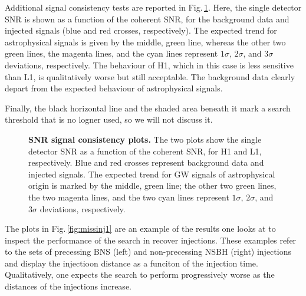 \documentclass[binding=0.6cm, LaM]{sapthesis}
\begin{document}
	Additional signal consistency tests are reported in Fig.\,\ref{fig:detector1}. 
	Here, the single detector SNR is shown as a function of the coherent SNR, 
	for the background data and injected signals (blue and red crosses, respectively).
	The expected trend for astrophysical signals is given by the middle, green line, 
	whereas the other two green lines, the magenta lines, and the cyan lines represent $1\sigma$, $2\sigma$, 
	and $3\sigma$ deviations, respectively.
	The behaviour of H1, which in this case is less sensitive than L1, 
	is qualitatively worse but still acceptable.  
	The background data clearly depart from the expected behaviour of astrophysical signals.
        
	Finally, the black horizontal line and the shaded area beneath it mark a search threshold 
	that is no logner used, so we will not discuss it.
        \begin{figure}[!t]
          \noindent
          \label{detector1}
          \centering
          \caption{\textbf{SNR signal consistency plots.} The two plots show the single detector SNR as a function of the coherent SNR, for H1 and L1, respectively.  Blue and red crosses represent background data and injected signals.  The expected trend for GW signals of astrophysical origin is marked by the middle, green line; the other two green lines, the two magenta lines, and the two cyan lines represent $1\sigma$, $2\sigma$, and $3\sigma$ deviations, respectively.}
          \label{fig:detector1}
        \end{figure}
	The plots in Fig.\,\ref{fig:missinj1} are an example of the results 
	one looks at to inspect the performance of the search in recover injections.
        These examples refer to the sets of precessing BNS (left) and non-precessing NSBH (right) 
	injections and display the injectioon distance as a funciton of the injection time.  
	Qualitatively, one expects the search to perform progressively worse 
	as the distances of the injections increase. 
\end{document}

